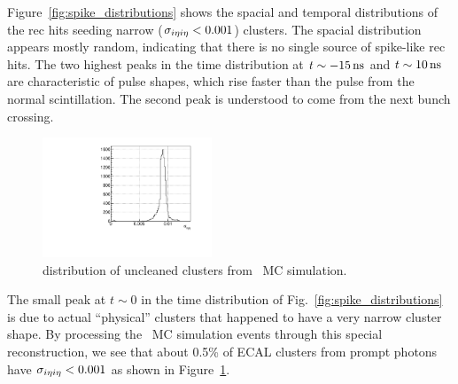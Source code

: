 Figure~\ref{fig:spike_distributions} shows the spacial and temporal distributions of the rec hits seeding narrow ($\sigma_{i\eta i\eta} < 0.001$) clusters. 
The spacial distribution appears mostly random, indicating that there is no single source of spike-like rec hits. 
The two highest peaks in the time distribution at $t \sim -15\, \text{ns}$ and $t \sim 10\, \text{ns}$ are characteristic of pulse shapes, which rise faster than the pulse from the normal scintillation. 
The second peak is understood to come from the next bunch crossing.

\begin{figure}[htbp]
  \centering
  \includegraphics[width=0.45\textwidth]{Reconstruction/Figures/spikes/sieie_mc.pdf}
  \caption{
    \sieie distribution of uncleaned clusters from \gj\ MC simulation.
  }
  \label{fig:sieie_mc}
\end{figure}

The small peak at $t\sim 0$ in the time distribution of Fig.~\ref{fig:spike_distributions} is due to actual ``physical'' clusters that happened to have a very narrow cluster shape. 
By processing the \gj\ MC simulation events through this special reconstruction, we see that about 0.5\% of ECAL clusters from prompt photons have $\sigma_{i\eta i\eta} < 0.001$ as shown in Figure~\ref{fig:sieie_mc}.

